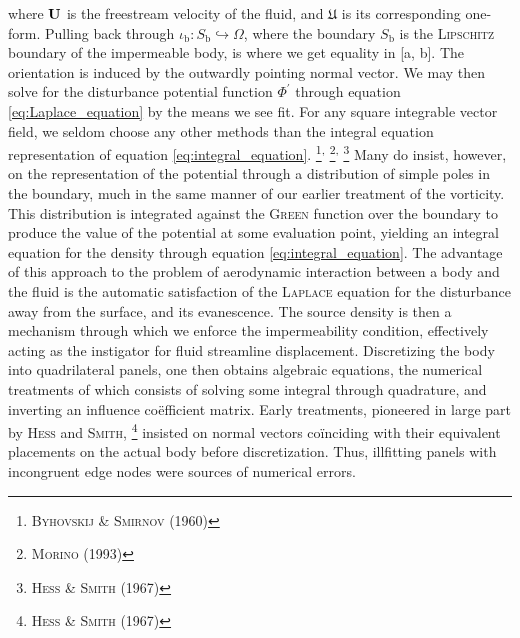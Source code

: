 \noindent
where $\mathbf{U}$ is the freestream velocity of the fluid, and $\mathfrak{U}$ is its corresponding one-form.
Pulling back through $\iota_{\mathrm{b}} \colon S_{\mathrm{b}} \hookrightarrow \Omega$, where the boundary $S_{\mathrm{b}}$ is the \textsc{Lipschitz} boundary of the impermeable body, is where we get equality in \subeqref{\ref{eq:impermeability}}[a, b].
The orientation is induced by the outwardly pointing normal vector.
We may then solve for the disturbance potential function $\Phi^{\prime}$ through equation \eqref{eq:Laplace_equation} by the means we see fit.
For any square integrable vector field, we seldom choose any other methods than the integral equation representation of equation \eqref{eq:integral_equation}.%
\footnote{%
        \cite{byhovskij1960orthogonal} \textsc{Byhovskij} \& \textsc{Smirnov} (1960)
}\textsuperscript{,}%
\footnote{%
        \cite{morino1993boundary} \textsc{Morino} (1993)
}\textsuperscript{,}%
\footnote{%
        \cite{hess1967calculation} \textsc{Hess} \& \textsc{Smith} (1967)
}
Many do insist, however, on the representation of the potential through a distribution of simple poles in the boundary, much in the same manner of our earlier treatment of the vorticity.
This distribution is integrated against the \textsc{Green} function over the boundary to produce the value of the potential at some evaluation point, yielding an integral equation for the density through equation \eqref{eq:integral_equation}.
The advantage of this approach to the problem of aerodynamic interaction between a body and the fluid is the automatic satisfaction of the \textsc{Laplace} equation for the disturbance away from the surface, and its evanescence.
The source density is then a mechanism through which we enforce the impermeability condition, effectively acting as the instigator for fluid streamline displacement.
Discretizing the body into quadrilateral panels, one then obtains algebraic equations, the numerical treatments of which consists of solving some integral through quadrature, and inverting an influence coëfficient matrix.
Early treatments, pioneered in large part by \textsc{Hess} and \textsc{Smith},%
\footnote{%
  \cite{hess1967calculation} \textsc{Hess} \& \textsc{Smith} (1967)
}
insisted on normal vectors coïnciding with their equivalent placements on the actual body before discretization.
Thus, illfitting panels with incongruent edge nodes were sources of numerical errors.

